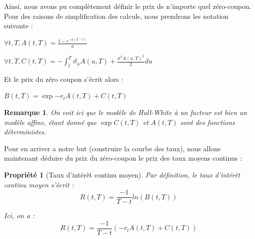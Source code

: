 \documentclass[11pt]{article}
\newtheorem{property}[theorem]{Propriété}
\newtheorem{remark}[theorem]{Remarque}
\let\vega\vartheta
\begin{document}
Ainsi, nous avons pu complètement définir le prix de n'importe quel zéro-coupon. Pour des raisons de simplification des calculs, nous prendrons les notation suivante : 

\begin{center}
$\forall t,T, A(t,T) = \frac{1-e^{-a(T-t)}}{a}$

$\forall t,T, C(t,T) = - \int_t^T \vega_u A(u,T) + \frac{ \sigma^2 A(u,T)^2}{2} du$
\end{center}

Et le prix du zéro coupon s'écrit alors : 


\begin{center}
$B(t,T)  = \exp{ - r_t A(t,T) + C(t,T)}$
\end{center}

\begin{remark}
On voit ici que le modèle de Hull-White à un facteur est bien un modèle affine, étant donné que $\exp{C(t,T)}$ et $A(t,T)$ sont des fonctions déterministes.
\end{remark}

Pour en arriver a notre but (construire la courbe des taux), nous allons maintenant déduire du prix du zéro-coupon le prix des taux moyens continus : 

\begin{property} [Taux d'intérêt continu moyen]
Par définition, le taux d'intérêt continu moyen s'écrit : 
\begin{displaymath}
R(t,T) = \frac{-1}{T-t} ln(B(t,T))
\end{displaymath}

Ici, on a : 
\begin{displaymath}
R(t,T) = \frac{-1}{T-t} ( - r_t A(t,T) + C(t,T))
\end{displaymath}

\end{property}




\end{document}

